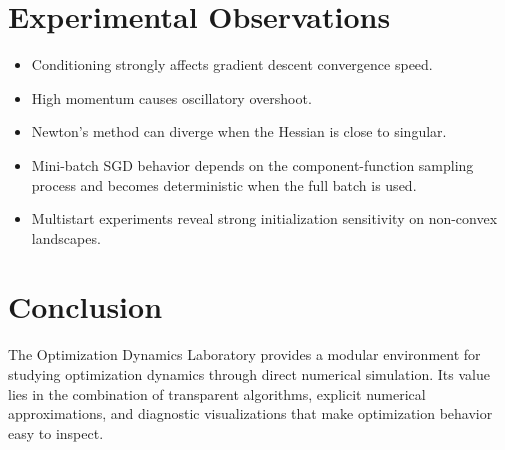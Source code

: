 \documentclass[12pt,a4paper]{report}
\begin{document}
\chapter{Experimental Observations}

\begin{itemize}
    \item Conditioning strongly affects gradient descent convergence speed.
    \item High momentum causes oscillatory overshoot.
    \item Newton's method can diverge when the Hessian is close to singular.
    \item Mini-batch \gls{SGD} behavior depends on the component-function sampling process and becomes deterministic when the full batch is used.
    \item Multistart experiments reveal strong initialization sensitivity on non-convex landscapes.
\end{itemize}

\chapter{Conclusion}

The Optimization Dynamics Laboratory provides a modular environment for studying optimization dynamics through direct numerical simulation. Its value lies in the combination of transparent algorithms, explicit numerical approximations, and diagnostic visualizations that make optimization behavior easy to inspect.

\printglossaries
\end{document}
